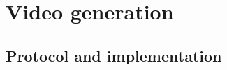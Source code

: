 \section{Video generation}
\label{supp:video}

\subsection{Protocol and implementation}
\label{supp:video-protocol}

\begin{figure}[t]
  \centering
  
\end{figure}

